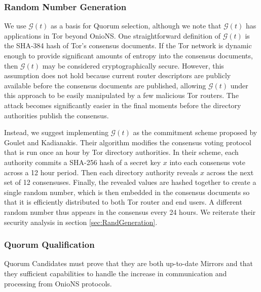 \documentclass[conference]{IEEEtran}
\begin{document}
\subsubsection{Random Number Generation}

We use $ \mathcal{G}(t) $ as a basis for Quorum selection, although we note that $ \mathcal{G}(t) $ has applications in Tor beyond OnioNS. One straightforward definition of $ \mathcal{G}(t) $ is the SHA-384 hash of Tor's consensus documents. If the Tor network is dynamic enough to provide significant amounts of entropy into the consensus documents, then $ \mathcal{G}(t) $ may be considered cryptographically secure. However, this assumption does not hold because current router descriptors are publicly available before the consensus documents are published, allowing $ \mathcal{G}(t) $ under this approach to be easily manipulated by a few malicious Tor routers. The attack becomes significantly easier in the final moments before the directory authorities publish the consensus.

Instead, we suggest implementing $ \mathcal{G}(t) $ as the commitment scheme proposed by Goulet and Kadianakis\cite{GouletCommitReveal}. Their algorithm modifies the consensus voting protocol that is run once an hour by Tor directory authorities. In their scheme, each authority commits a SHA-256 hash of a secret key $ x $ into each consensus vote across a 12 hour period. Then each directory authority reveals $ x $ across the next set of 12 consensuses. Finally, the revealed values are hashed together to create a single random number, which is then embedded in the consensus documents so that it is efficiently distributed to both Tor router and end users. A different random number thus appears in the consensus every 24 hours. We reiterate their security analysis in section \ref{sec:RandGeneration}.

\subsubsection{Quorum Qualification}

Quorum Candidates must prove that they are both up-to-date Mirrors and that they sufficient capabilities to handle the increase in communication and processing from OnioNS protocols.
\end{document}
